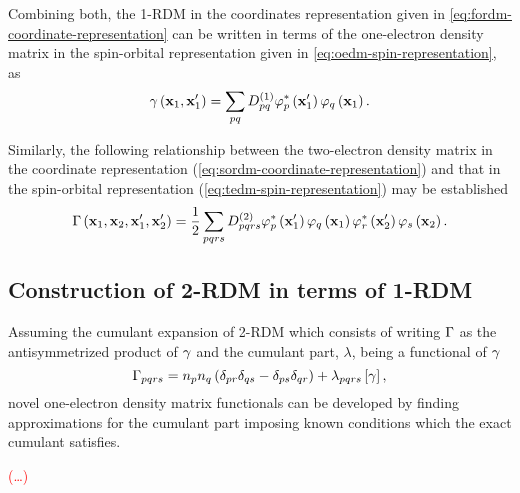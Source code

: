 Combining both, the 1-RDM in the coordinates representation given in 
\cref{eq:fordm-coordinate-representation} can be written
in terms of the one-electron density matrix in the spin-orbital representation
given in \cref{eq:oedm-spin-representation}, as
\begin{equation}
    \gamma \left( \boldsymbol{\mathrm{x}}_1, \boldsymbol{\mathrm{x}}_1^{\prime} \right) =
    \sum_{pq} D^{\left( 1 \right)}_{pq} 
    \varphi_p^{*} \left( \boldsymbol{\mathrm{x}}_1^{\prime} \right)
    \varphi_q \left( \boldsymbol{\mathrm{x}}_1 \right)
    .
\end{equation}

Similarly, the following relationship between the two-electron density matrix
in the coordinate representation (\cref{eq:sordm-coordinate-representation}) 
and that in the spin-orbital representation (\cref{eq:tedm-spin-representation})
may be established
\begin{equation}
    \Gamma \left( \boldsymbol{\mathrm{x}}_1, \boldsymbol{\mathrm{x}}_2, \boldsymbol{\mathrm{x}}_1^{\prime}, \boldsymbol{\mathrm{x}}_2^{\prime} \right)
    =
    \frac{1}{2} \sum_{pqrs} D^{\left( 2 \right)}_{pqrs}
    \varphi_p^{*}\left( \boldsymbol{\mathrm{x}}_1^{\prime} \right)
    \varphi_q    \left( \boldsymbol{\mathrm{x}}_1          \right)
    \varphi_r^{*}\left( \boldsymbol{\mathrm{x}}_2^{\prime} \right)
    \varphi_s    \left( \boldsymbol{\mathrm{x}}_2          \right)
    .
\end{equation}



\subsection{Construction of 2-RDM in terms of 1-RDM}


Assuming the cumulant expansion of 2-RDM which
consists of writing $\Gamma$ as the antisymmetrized product of $\gamma$ and
the cumulant part, $\lambda$, being a functional of $\gamma$ 
\begin{equation}
    \Gamma_{pqrs} =
    n_p n_q \left( \delta_{pr} \delta_{qs} - \delta_{ps} \delta_{qr} \right)
    + \lambda_{pqrs} \left[ \gamma \right]
    ,
\end{equation}
novel one-electron density matrix functionals can be developed by finding
approximations for the cumulant part imposing known conditions which the exact
cumulant satisfies.

\textcolor{red}{(\ldots)}


